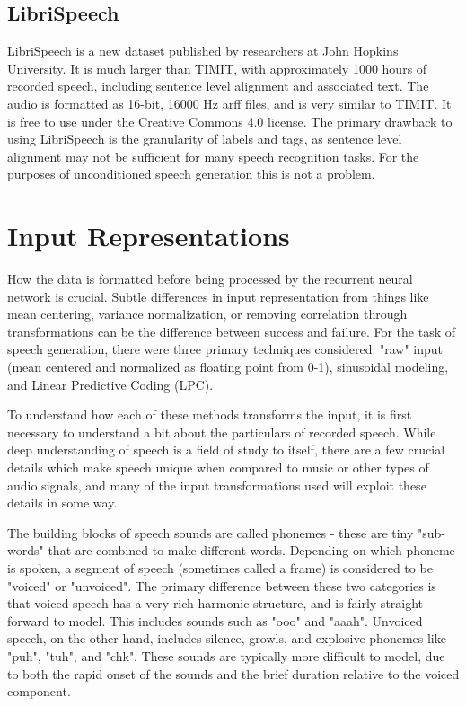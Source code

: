\documentclass{article} %
\begin{document}
\subsection{LibriSpeech}
LibriSpeech is a new dataset published by researchers at
John Hopkins University. It is much larger than TIMIT, with approximately
1000 hours of recorded speech, including sentence level alignment and associated
text. The audio is formatted as 16-bit, 16000 Hz arff files, and is very
similar to TIMIT. It is free to use under the Creative Commons 4.0 license.
The primary drawback to using LibriSpeech is the granularity of labels and
tags, as sentence level alignment may not be sufficient for many speech
recognition tasks. For the purposes of unconditioned speech generation
this is not a problem.

\section{Input Representations}
How the data is formatted before being processed by the recurrent neural
network is crucial. Subtle differences in input representation from things
like mean centering, variance normalization, or removing correlation 
through transformations can be the difference between success and failure. For
the task of speech generation, there were three primary techniques
considered: "raw" input (mean centered and normalized as floating point from 0-1),
sinusoidal modeling, and Linear Predictive Coding (LPC).
\par
To understand how each of these methods transforms the input, it is first
necessary to understand a bit about the particulars of recorded speech. While
deep understanding of speech is a field of study to itself, there are a few
crucial details which make speech unique when compared to music
or other types of audio signals, and many of the input 
transformations used will exploit these details in some way.
\par
The building blocks of speech sounds are called phonemes - these are tiny
"sub-words" that are combined to make different words. Depending on which
phoneme is spoken, a segment of speech (sometimes called a frame) is considered
to be "voiced" or "unvoiced". The primary difference between these two
categories is that voiced speech has a very rich harmonic structure,
and is fairly straight forward to model. This includes sounds such as
"ooo" and "aaah". Unvoiced speech, on the other hand, includes silence,
growls, and explosive phonemes like "puh", "tuh", and "chk". These sounds
are typically more difficult to model, due to both the rapid onset of the
sounds and the brief duration relative to the voiced component. 
\end{document}
